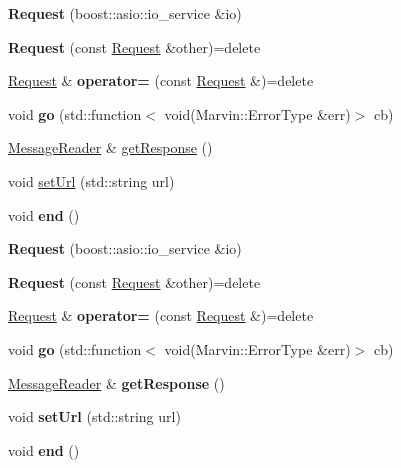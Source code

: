 \begin{DoxyCompactItemize}
\item 
\mbox{\label{class_request_a94f71ef02d2d80f134e3a83064b66589}} 
{\bfseries Request} (boost\+::asio\+::io\+\_\+service \&io)
\item 
\mbox{\label{class_request_aaea4c25d9eef0985a1e5dd57a5b29633}} 
{\bfseries Request} (const \hyperlink{class_request}{Request} \&other)=delete
\item 
\mbox{\label{class_request_ad7fb0a96230a4f6f778d636a1a0b0335}} 
\hyperlink{class_request}{Request} \& {\bfseries operator=} (const \hyperlink{class_request}{Request} \&)=delete
\item 
\mbox{\label{class_request_a181c57295b0a5e2f28b1845f9d605260}} 
void {\bfseries go} (std\+::function$<$ void(Marvin\+::\+Error\+Type \&err)$>$ cb)
\item 
\hyperlink{class_message_reader}{Message\+Reader} \& \hyperlink{class_request_ac9e91894d06fac3bcb657ba64693da22}{get\+Response} ()
\item 
void \hyperlink{class_request_a0a0cc1ae66771dd92c1ad78e9e6df59a}{set\+Url} (std\+::string url)
\item 
\mbox{\label{class_request_a34a6c9ee0d9789a98950e3146c42db14}} 
void {\bfseries end} ()
\item 
\mbox{\label{class_request_a94f71ef02d2d80f134e3a83064b66589}} 
{\bfseries Request} (boost\+::asio\+::io\+\_\+service \&io)
\item 
\mbox{\label{class_request_aaea4c25d9eef0985a1e5dd57a5b29633}} 
{\bfseries Request} (const \hyperlink{class_request}{Request} \&other)=delete
\item 
\mbox{\label{class_request_ad7fb0a96230a4f6f778d636a1a0b0335}} 
\hyperlink{class_request}{Request} \& {\bfseries operator=} (const \hyperlink{class_request}{Request} \&)=delete
\item 
\mbox{\label{class_request_a181c57295b0a5e2f28b1845f9d605260}} 
void {\bfseries go} (std\+::function$<$ void(Marvin\+::\+Error\+Type \&err)$>$ cb)
\item 
\mbox{\label{class_request_a367164dedd048b63c542ad028bade31b}} 
\hyperlink{class_message_reader}{Message\+Reader} \& {\bfseries get\+Response} ()
\item 
\mbox{\label{class_request_a0a0cc1ae66771dd92c1ad78e9e6df59a}} 
void {\bfseries set\+Url} (std\+::string url)
\item 
\mbox{\label{class_request_a34a6c9ee0d9789a98950e3146c42db14}} 
void {\bfseries end} ()
\end{DoxyCompactItemize}
